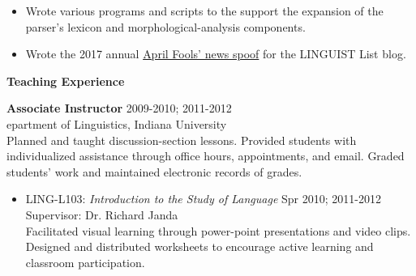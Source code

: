 \begin{singlespace}
\begin{itemize}
\item Wrote various programs and scripts to the support the expansion of the parser's lexicon and morphological-analysis components. 
\item Wrote the 2017 annual \href{https://blog.linguistlist.org/uncategorized/incredible-parrot-speech-decoded-as-300-years-old-english-dialect/}{April Fools' news spoof}  for the LINGUIST List blog. %
\end{itemize}
\vspace{15pt}
\centerline{\textbf{\large Teaching Experience}}
\vspace{8pt}
\noindent\textbf{Associate Instructor} \hfill 2009-2010; 2011-2012 \\
epartment of Linguistics, Indiana University \\
\vspace{-3pt}
\noindent Planned and taught discussion-section lessons. Provided students with individualized assistance through office hours, appointments, and email. Graded students' work and maintained electronic records of grades. \\
\begin{itemize} \itemsep2pt
\item LING-L103: \textit{Introduction to the Study of Language} \hfill Spr 2010; 2011-2012 \\
Supervisor: Dr. Richard Janda \\
\noindent Facilitated visual learning through power-point presentations and video clips. Designed and distributed worksheets to encourage active learning and classroom participation.

\end{itemize}
\end{singlespace}
